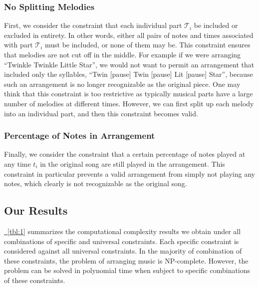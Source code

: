 \documentclass[11pt,letterpaper]{article}
\newcommand{\figref}[2][{}]{\hyperref[#2]{\figurename~\ref{#2}#1}}
\begin{document}
\subsubsection{No Splitting Melodies}
First, we consider the constraint that each individual part $\mathcal{T}_i$ be included or excluded in entirety. In other words, either all pairs of notes and times associated with part $\mathcal{T}_i$ must be included, or none of them may be. This constraint ensures that melodies are not cut off in the middle. For example if we were arranging ``Twinkle Twinkle Little Star'', we would not want to permit an arrangement that included only the syllables, ``Twin [pause] Twin [pause] Lit [pause] Star'', because such an arrangement is no longer recognizable as the original piece. One may think that this constraint is too restrictive as typically musical parts have a large number of melodies at different times. However, we can first split up each melody into an individual part, and then this constraint becomes valid.

\subsubsection{ Percentage of Notes in Arrangement}
Finally, we consider the constraint that a certain percentage of notes played at any time $t_i$ in the original song are still played in the arrangement. This constraint in particular prevents a valid arrangement from simply not playing any notes, which clearly is not recognizable as the original song.

\subsection{Our Results}
\figref{tbl:1} summarizes the computational complexity results we obtain under all combinations of specific and universal constraints. Each specific constraint is considered against all universal constraints. In the majority of combination of these constraints, the problem of arranging music is NP-complete. However, the problem can be solved in polynomial time when subject to specific combinations of these constraints.
\end{document}
